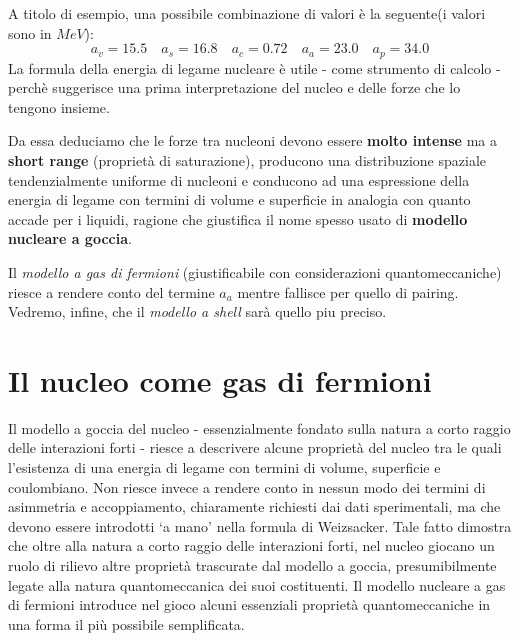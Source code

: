 A titolo di esempio, una possibile combinazione di valori è la seguente(i
valori sono in \(MeV\)):
\[
	a_{v} = 15.5 \quad a_{s} = 16.8 \quad a_{c} = 0.72 \quad a_{a} = 23.0 \quad a_{p} = 34.0
\]
La formula della energia di legame nucleare è utile - come strumento di
calcolo - perchè suggerisce una prima interpretazione del nucleo e delle
forze che lo tengono insieme.

Da essa deduciamo che le forze tra nucleoni devono essere \textbf{molto
	intense} ma a \textbf{short range} (proprietà di saturazione), producono
una distribuzione spaziale tendenzialmente uniforme di nucleoni e
conducono ad una espressione della energia di legame con termini di
volume e superficie in analogia con quanto accade per i liquidi, ragione
che giustifica il nome spesso usato di \textbf{modello nucleare a
	goccia}.

Il \emph{modello a gas di fermioni} (giustificabile con considerazioni
quantomeccaniche) riesce a rendere conto del termine \(a_{a}\) mentre
fallisce per quello di pairing.
Vedremo, infine, che il \emph{modello a shell} sarà quello piu preciso.

\section{Il nucleo come gas di fermioni}\label{sec:il-nucleo-come-gas-di-fermioni}

Il modello a goccia del nucleo - essenzialmente fondato sulla natura a corto raggio delle interazioni forti - riesce a
descrivere alcune proprietà del nucleo tra le quali l’esistenza di una energia di legame con termini di volume, superficie e coulombiano.
Non riesce invece a rendere conto in nessun modo dei termini di asimmetria e accoppiamento, chiaramente richiesti dai
dati sperimentali, ma che devono essere introdotti ‘a mano’ nella formula di Weizsacker.
Tale fatto dimostra che oltre alla natura a corto raggio delle interazioni forti, nel nucleo giocano un ruolo di rilievo
altre proprietà trascurate dal modello a goccia, presumibilmente legate alla natura quantomeccanica dei suoi costituenti.
Il modello nucleare a gas di fermioni introduce nel gioco alcuni essenziali proprietà quantomeccaniche in una forma il
più possibile semplificata.





